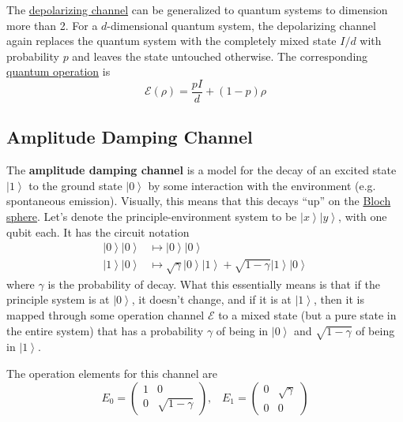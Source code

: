 \documentclass{article}
\newcommand{\ket}[1]{\ensuremath{\left|#1\right\rangle}}
\newcounter{definition}[section]
\begin{document}
    The \hyperref[def:depolarizing-channel]{depolarizing channel} can be generalized to quantum systems to dimension more than 2. For a $d$-dimensional quantum system, the depolarizing channel again replaces the quantum system with the completely mixed state $I/d$ with probability $p$ and leaves the state untouched otherwise. The corresponding \hyperref[def:quantum-operation]{quantum operation} is 
    \begin{equation}
      \mathcal{E}(\rho) = \frac{p I}{d} + (1 - p) \rho 
    \end{equation}

  \subsection{Amplitude Damping Channel}

    \begin{definition}
      \label{def:amplitude-damping-channel}
      The \textbf{amplitude damping channel} is a model for the decay of an excited state $\ket{1}$ to the ground state $\ket{0}$ by some interaction with the environment (e.g. spontaneous emission). Visually, this means that this decays ``up'' on the \hyperref[def:bloch-sphere]{Bloch sphere}. Let's denote the principle-environment system to be $\ket{x} \ket{y}$, with one qubit each. It has the circuit notation 
      \begin{align}
        \ket{0} \ket{0} & \mapsto \ket{0} \ket{0} \\ 
        \ket{1} \ket{0} & \mapsto \sqrt{\gamma} \ket{0} \ket{1} + \sqrt{1 - \gamma} \ket{1} \ket{0}
      \end{align}
      where $\gamma$ is the probability of decay. What this essentially means is that if the principle system is at $\ket{0}$, it doesn't change, and if it is at $\ket{1}$, then it is mapped through some operation channel $\mathcal{E}$ to a mixed state (but a pure state in the entire system) that has a probability $\gamma$ of being in $\ket{0}$ and $\sqrt{1 - \gamma}$ of being in $\ket{1}$. 
      \begin{figure}[H]
        \centering 
        \caption{} 
        \label{fig:amplitude_damping_circuit}
      \end{figure}
      The operation elements for this channel are 
      \begin{equation}
        E_0 = \begin{pmatrix} 1 & 0 \\ 0 & \sqrt{1 - \gamma} \end{pmatrix}, \;\;\; E_1 = \begin{pmatrix} 0 & \sqrt{\gamma} \\ 0 & 0 \end{pmatrix}

\end{equation}
\end{definition}
\end{document}
